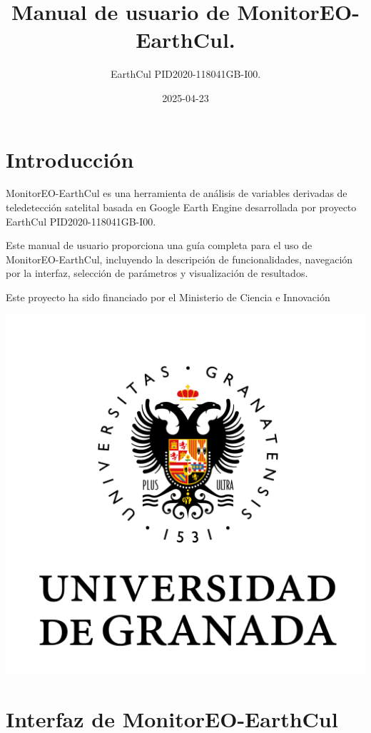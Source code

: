 \documentclass[
]{book}
\title{Manual de usuario de MonitorEO-EarthCul.}
\author{EarthCul PID2020-118041GB-I00.}
\date{2025-04-23}
\begin{document}
\maketitle

{
\setcounter{tocdepth}{1}
\tableofcontents
}
\chapter{Introducción}\label{intro}

MonitorEO-EarthCul es una herramienta de análisis de variables derivadas de teledetección satelital basada en Google Earth Engine desarrollada por proyecto EarthCul PID2020-118041GB-I00.

Este manual de usuario proporciona una guía completa para el uso de MonitorEO-EarthCul, incluyendo la descripción de funcionalidades, navegación por la interfaz, selección de parámetros y visualización de resultados.

Este proyecto ha sido financiado por el Ministerio de Ciencia e Innovación

\includegraphics{assets/logo-ugr.png}

\chapter{Interfaz de MonitorEO-EarthCul}\label{interfaz}
\end{document}
